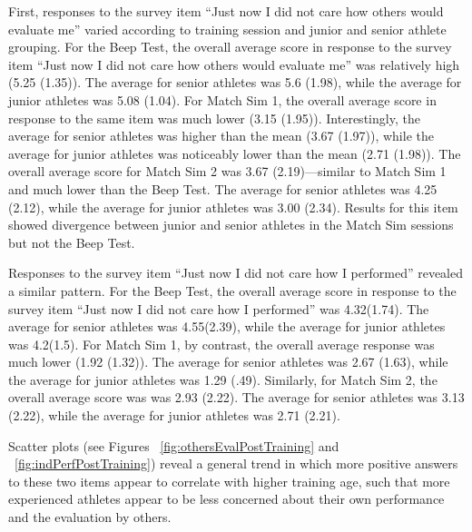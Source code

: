 \begin{CJK}{UTF8}{gbsn}
First, responses to the survey item ``Just now I did not care how others would evaluate me'' varied according to training session and junior and senior athlete grouping.  For the Beep Test, the overall average score in response to the survey item ``Just now I did not care how others would evaluate me'' was relatively high (5.25 (1.35)).  The average for senior athletes was 5.6 (1.98), while the average for junior athletes was 5.08 (1.04).  For Match Sim 1, the overall average score in response to the same item was much lower (3.15 (1.95)). Interestingly, the average for senior athletes was higher than the mean (3.67 (1.97)), while the average for junior athletes was noticeably lower than the mean (2.71 (1.98)).  The overall average score for Match Sim 2 was 3.67 (2.19)---similar to Match Sim 1 and much lower than the Beep Test.  The average for senior athletes was 4.25 (2.12), while the average for junior athletes was 3.00 (2.34). Results for this item showed divergence between junior and senior athletes in the Match Sim sessions but not the Beep Test.

Responses to the survey item ``Just now I did not care how I performed'' revealed a similar pattern.  For the Beep Test, the overall average score in response to the survey item ``Just now I did not care how I performed'' was 4.32(1.74). The average for senior athletes was 4.55(2.39), while the average for junior athletes was 4.2(1.5).  For Match Sim 1, by contrast, the overall average response was much lower (1.92 (1.32)).  The average for senior athletes was 2.67 (1.63), while the average for junior athletes was 1.29 (.49). Similarly, for Match Sim 2, the overall average score was was 2.93 (2.22).  The average for senior athletes was 3.13 (2.22), while the average for junior athletes was 2.71 (2.21).

Scatter plots (see Figures ~\ref{fig:othersEvalPostTraining} and ~\ref{fig:indPerfPostTraining}) reveal a general trend in which more positive answers to these two items appear to correlate with higher training age, such that more experienced athletes appear to be less concerned about their own performance and the evaluation by others.




\end{CJK}
